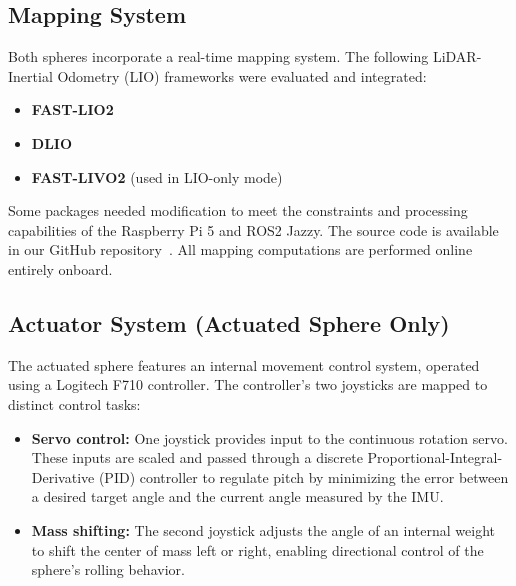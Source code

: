 \documentclass[conference]{IEEEtran}
\begin{document}
\subsection{Mapping System}

Both spheres incorporate a real-time mapping system. 
The following LiDAR-Inertial Odometry (LIO) frameworks were evaluated and integrated:

\begin{itemize}
    \item \textbf{FAST-LIO2}
    \item \textbf{DLIO}
    \item \textbf{FAST-LIVO2} (used in LIO-only mode)
\end{itemize}

Some packages needed modification to meet the constraints and processing capabilities of the Raspberry Pi 5 and ROS2 Jazzy.
The source code is available in our GitHub repository~\cite{githubsphere}.
All mapping computations are performed online entirely onboard.

\subsection{Actuator System (Actuated Sphere Only)}

The actuated sphere features an internal movement control system, operated using a  Logitech F710 controller. 
The controller's two joysticks are mapped to distinct control tasks:

\begin{itemize}
    \item \textbf{Servo control:} One joystick provides input to the continuous rotation servo. 
    These inputs are scaled and passed through a discrete Proportional-Integral-Derivative (PID) controller to regulate pitch by minimizing the error between a desired target angle and the current angle measured by the IMU.
    \item \textbf{Mass shifting:} The second joystick adjusts the angle of an internal weight to shift the center of mass left or right, enabling directional control of the sphere's rolling behavior.
\end{itemize}

\end{document}
